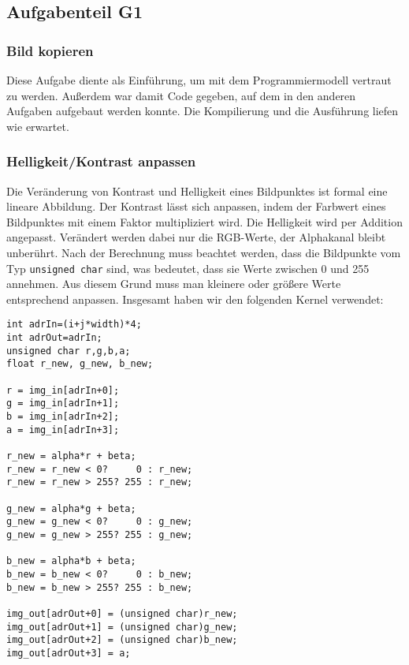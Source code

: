 \documentclass[12pt,a4paper]{scrartcl}
\begin{document}
\subsection{Aufgabenteil G1}

\subsubsection{Bild kopieren}
Diese Aufgabe diente als Einf\"uhrung, um mit dem Programmiermodell vertraut zu werden.
Au\ss erdem war damit Code gegeben, auf dem in den anderen Aufgaben aufgebaut werden konnte.
Die Kompilierung und die Ausf\"uhrung liefen wie erwartet.

\subsubsection{Helligkeit/Kontrast anpassen}
Die Ver\"anderung von Kontrast und Helligkeit eines Bildpunktes ist formal eine lineare Abbildung.
Der Kontrast l\"asst sich anpassen, indem der Farbwert eines Bildpunktes mit einem Faktor multipliziert wird.
Die Helligkeit wird per Addition angepasst.
Ver\"andert werden dabei nur die RGB-Werte, der Alphakanal bleibt unber\"uhrt.
Nach der Berechnung muss beachtet werden, dass die Bildpunkte vom Typ \texttt{unsigned char} sind, was bedeutet, dass sie Werte zwischen 0 und 255 annehmen.
Aus diesem Grund muss man kleinere oder gr\"o\ss ere Werte entsprechend anpassen.
Insgesamt haben wir den folgenden Kernel verwendet:

\begin{lstlisting}[caption=linearTransformKernel,label=a2.2]
int adrIn=(i+j*width)*4;
int adrOut=adrIn;
unsigned char r,g,b,a;
float r_new, g_new, b_new;
        
r = img_in[adrIn+0];
g = img_in[adrIn+1];
b = img_in[adrIn+2];
a = img_in[adrIn+3];
        
r_new = alpha*r + beta;
r_new = r_new < 0?     0 : r_new;
r_new = r_new > 255? 255 : r_new;
        
g_new = alpha*g + beta;
g_new = g_new < 0?     0 : g_new;
g_new = g_new > 255? 255 : g_new;
        
b_new = alpha*b + beta;
b_new = b_new < 0?     0 : b_new;
b_new = b_new > 255? 255 : b_new;
        
img_out[adrOut+0] = (unsigned char)r_new;
img_out[adrOut+1] = (unsigned char)g_new;
img_out[adrOut+2] = (unsigned char)b_new;
img_out[adrOut+3] = a;

\end{lstlisting}
\end{document}
